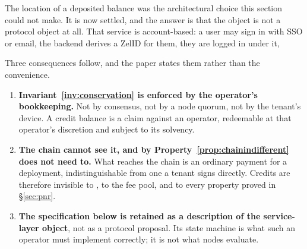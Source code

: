 \begin{remark}
\label{rem:balance-location}
The location of a deposited balance was the architectural choice this section could not make. It is
now settled, and the answer is that the object is not a protocol object at all.  That service is account-based: a user may
sign in with SSO or email, the backend derives a ZelID for them, they are logged in under it, 

Three consequences follow, and the paper states them rather than the convenience.
\begin{enumerate}
  \item \textbf{Invariant~\ref{inv:conservation} is enforced by the operator's bookkeeping.} Not by
  consensus, not by a node quorum, not by the tenant's device. A credit balance is a claim against an
  operator, redeemable at that operator's discretion and subject to its solvency.
  \item \textbf{The chain cannot see it, and by Property~\ref{prop:chainindifferent} does not need
  to.} What reaches the chain is an ordinary payment for a deployment, indistinguishable from one a
  tenant signs directly. Credits are therefore invisible to \PNR, to the fee pool, and to every
  property proved in \S\ref{sec:pnr}.
  \item \textbf{The specification below is retained as a description of the service-layer object},
  not as a protocol proposal. Its state machine is what such an operator must implement correctly;
  it is not what nodes evaluate.
\end{enumerate}
\end{remark}

